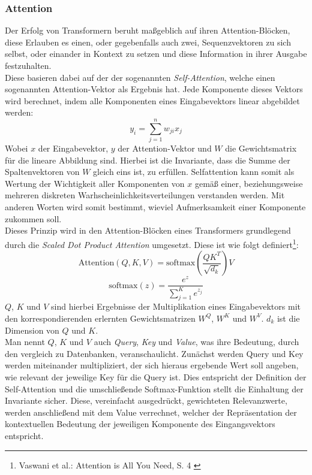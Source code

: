 \subsubsection{Attention}

Der Erfolg von Transformern beruht maßgeblich auf ihren Attention-Blöcken, diese Erlauben es einen, oder gegebenfalls auch zwei, Sequenzvektoren zu sich selbst, oder einander in Kontext zu setzen und diese Information in ihrer Ausgabe festzuhalten. \\
Diese basieren dabei auf der der sogenannten \textit{Self-Attention}, welche einen sogenannten Attention-Vektor als Ergebnis hat. Jede Komponente dieses Vektors wird berechnet, indem alle Komponenten eines Eingabevektors linear abgebildet werden:
\begin{equation}
    y_i = \sum_{j=1}^n w_{ji}x_j
\end{equation}
Wobei $x$ der Eingabevektor, $y$ der Attention-Vektor und $W$ die Gewichtsmatrix für die lineare Abbildung sind. Hierbei ist die Invariante, dass die Summe der Spaltenvektoren von $W$ gleich eins ist, zu erfüllen. Selfattention kann somit als Wertung der Wichtigkeit aller Komponenten von $x$ gemäß einer, beziehungsweise mehreren diskreten Warhscheinlichkeitsverteilungen verstanden werden. Mit anderen Worten wird somit bestimmt, wieviel Aufmerksamkeit einer Komponente zukommen soll. \\
Dieses Prinzip wird in den Attention-Blöcken eines Transformers grundlegend durch die \textit{Scaled Dot Product Attention} umgesetzt. Diese ist wie folgt definiert\footnote{
    Vaswani et al.: Attention is All You Need, S. 4
    \cite{vaswani2023attentionneed}
}:
\begin{equation}
    \text{Attention}(Q, K, V) = \text{softmax}
    \left (
        \frac {QK^T} {\sqrt{d_k}}
    \right ) V
\end{equation}
\begin{equation}
    \text{softmax}(z) = \frac{e^z}{\sum_{j=1}^K e^{z_j}}
\end{equation}
$Q$, $K$ und $V$ sind hierbei Ergebnisse der Multiplikation eines Eingabevektors mit den korrespondierenden erlernten Gewichtsmatrizen $W^Q$, $W^K$ und $W^V$. $d_k$ ist die Dimension von $Q$ und $K$. \\
Man nennt $Q$, $K$ und $V$ auch \textit{Query}, \textit{Key} und \textit{Value}, was ihre Bedeutung, durch den vergleich zu Datenbanken, veranschaulicht. Zunächst werden Query und Key werden miteinander multipliziert, der sich hieraus ergebende Wert soll angeben, wie relevant der jeweilige Key für die Query ist. Dies entspricht der Definition der Self-Attention und die umschließende Softmax-Funktion stellt die Einhaltung der Invariante sicher. Diese, vereinfacht ausgedrückt, gewichteten Relevanzwerte, werden anschließend mit dem Value verrechnet, welcher der Repräsentation der kontextuellen Bedeutung der jeweiligen Komponente des Eingangsvektors entspricht. \\
